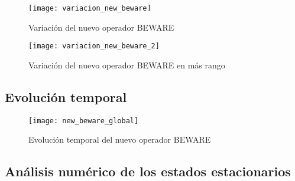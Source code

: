 \begin{figure}[h]
	\texttt{[image: variacion\_new\_beware]}
	\centering
	\caption{Variación del nuevo operador BEWARE }
	\label{vari_beware}
\end{figure}

\begin{figure}[h]
	\texttt{[image: variacion\_new\_beware\_2]}
	\centering
	\caption{Variación del nuevo operador BEWARE en más rango}
	\label{vari_beware_2}
\end{figure}

\subsection{Evolución temporal}

\begin{figure}[h]
	\texttt{[image: new\_beware\_global]}
	\centering
	\caption{Evolución temporal del nuevo operador BEWARE}
	\label{evolu_beware}
\end{figure}

\subsection{Análisis numérico de los estados estacionarios}


